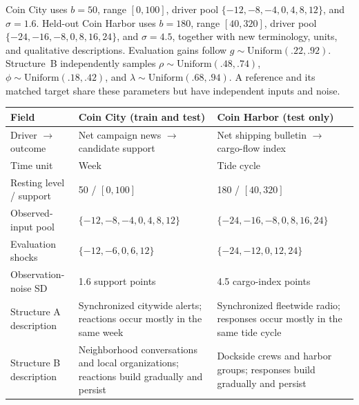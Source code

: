 Coin City uses $b=50$, range $[0,100]$, driver pool
$\{-12,-8,-4,0,4,8,12\}$, and $\sigma=1.6$. Held-out Coin Harbor uses
$b=180$, range $[40,320]$, driver pool
$\{-24,-16,-8,0,8,16,24\}$, and $\sigma=4.5$, together with new terminology,
units, and qualitative descriptions. Evaluation gains follow
$g\sim\mathrm{Uniform}(.22,.92)$. Structure~B independently samples
$\rho\sim\mathrm{Uniform}(.48,.74)$,
$\phi\sim\mathrm{Uniform}(.18,.42)$, and
$\lambda\sim\mathrm{Uniform}(.68,.94)$. A reference and its matched target share
these parameters but have independent inputs and noise.

\begin{center}
\begin{minipage}{\linewidth}
\centering
{}
\label{tab:exp3-domain-contrast}
\footnotesize
\setlength{\tabcolsep}{3pt}
\renewcommand{\arraystretch}{1.05}
\begin{tabular}{p{.20\linewidth}p{.36\linewidth}p{.36\linewidth}}
\toprule
\textbf{Field} & \textbf{Coin City (train and test)} & \textbf{Coin Harbor (test only)} \\
\midrule
Driver $\to$ outcome & Net campaign news $\to$ candidate support & Net shipping
bulletin $\to$ cargo-flow index \\
Time unit & Week & Tide cycle \\
Resting level / support & 50 / $[0,100]$ & 180 / $[40,320]$ \\
Observed-input pool & $\{-12,-8,-4,0,4,8,12\}$ &
$\{-24,-16,-8,0,8,16,24\}$ \\
Evaluation shocks & $\{-12,-6,0,6,12\}$ & $\{-24,-12,0,12,24\}$ \\
Observation-noise SD & 1.6 support points & 4.5 cargo-index points \\
Structure A description & Synchronized citywide alerts; reactions occur mostly in
the same week & Synchronized fleetwide radio; responses occur mostly in the same
tide cycle \\
Structure B description & Neighborhood conversations and local organizations;
reactions build gradually and persist & Dockside crews and harbor groups; responses
build gradually and persist \\
\bottomrule
\end{tabular}
\end{minipage}
\end{center}

